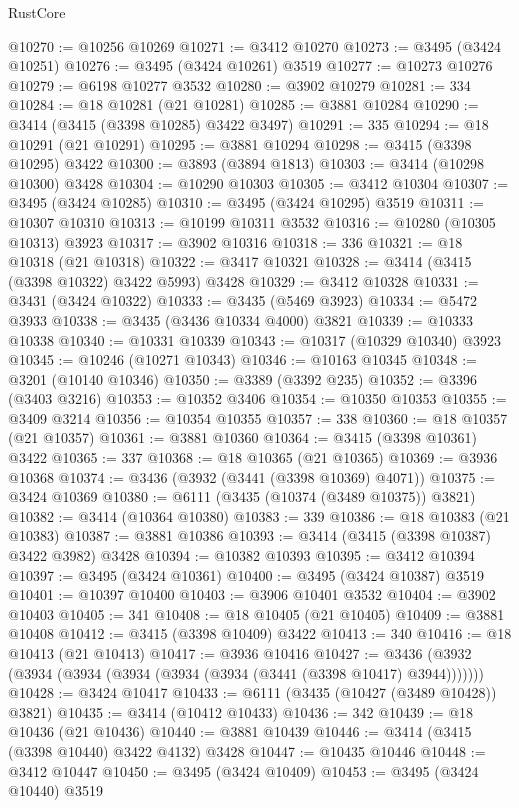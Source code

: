 \begin{lexlean}{RustCore}
\begin{coremodule}
@10270 := @10256 @10269
@10271 := @3412 @10270
@10273 := @3495 (@3424 @10251)
@10276 := @3495 (@3424 @10261) @3519
@10277 := @10273 @10276
@10279 := @6198 @10277 @3532
@10280 := @3902 @10279
@10281 := 334
@10284 := @18 @10281 (@21 @10281)
@10285 := @3881 @10284
@10290 := @3414 (@3415 (@3398 @10285) @3422 @3497)
@10291 := 335
@10294 := @18 @10291 (@21 @10291)
@10295 := @3881 @10294
@10298 := @3415 (@3398 @10295) @3422
@10300 := @3893 (@3894 @1813)
@10303 := @3414 (@10298 @10300) @3428
@10304 := @10290 @10303
@10305 := @3412 @10304
@10307 := @3495 (@3424 @10285)
@10310 := @3495 (@3424 @10295) @3519
@10311 := @10307 @10310
@10313 := @10199 @10311 @3532
@10316 := @10280 (@10305 @10313) @3923
@10317 := @3902 @10316
@10318 := 336
@10321 := @18 @10318 (@21 @10318)
@10322 := @3417 @10321
@10328 := @3414 (@3415 (@3398 @10322) @3422 @5993) @3428
@10329 := @3412 @10328
@10331 := @3431 (@3424 @10322)
@10333 := @3435 (@5469 @3923)
@10334 := @5472 @3933
@10338 := @3435 (@3436 @10334 @4000) @3821
@10339 := @10333 @10338
@10340 := @10331 @10339
@10343 := @10317 (@10329 @10340) @3923
@10345 := @10246 (@10271 @10343)
@10346 := @10163 @10345
@10348 := @3201 (@10140 @10346)
@10350 := @3389 (@3392 @235)
@10352 := @3396 (@3403 @3216)
@10353 := @10352 @3406
@10354 := @10350 @10353
@10355 := @3409 @3214
@10356 := @10354 @10355
@10357 := 338
@10360 := @18 @10357 (@21 @10357)
@10361 := @3881 @10360
@10364 := @3415 (@3398 @10361) @3422
@10365 := 337
@10368 := @18 @10365 (@21 @10365)
@10369 := @3936 @10368
@10374 := @3436 (@3932 (@3441 (@3398 @10369) @4071))
@10375 := @3424 @10369
@10380 := @6111 (@3435 (@10374 (@3489 @10375)) @3821)
@10382 := @3414 (@10364 @10380)
@10383 := 339
@10386 := @18 @10383 (@21 @10383)
@10387 := @3881 @10386
@10393 := @3414 (@3415 (@3398 @10387) @3422 @3982) @3428
@10394 := @10382 @10393
@10395 := @3412 @10394
@10397 := @3495 (@3424 @10361)
@10400 := @3495 (@3424 @10387) @3519
@10401 := @10397 @10400
@10403 := @3906 @10401 @3532
@10404 := @3902 @10403
@10405 := 341
@10408 := @18 @10405 (@21 @10405)
@10409 := @3881 @10408
@10412 := @3415 (@3398 @10409) @3422
@10413 := 340
@10416 := @18 @10413 (@21 @10413)
@10417 := @3936 @10416
@10427 := @3436 (@3932 (@3934 (@3934 (@3934 (@3934 (@3934 (@3441 (@3398 @10417) @3944)))))))
@10428 := @3424 @10417
@10433 := @6111 (@3435 (@10427 (@3489 @10428)) @3821)
@10435 := @3414 (@10412 @10433)
@10436 := 342
@10439 := @18 @10436 (@21 @10436)
@10440 := @3881 @10439
@10446 := @3414 (@3415 (@3398 @10440) @3422 @4132) @3428
@10447 := @10435 @10446
@10448 := @3412 @10447
@10450 := @3495 (@3424 @10409)
@10453 := @3495 (@3424 @10440) @3519

\end{coremodule}
\end{lexlean}

